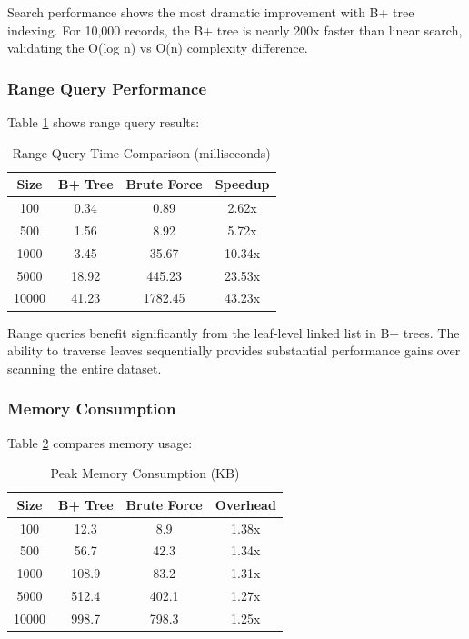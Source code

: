 \documentclass[conference]{IEEEtran}
\begin{document}
Search performance shows the most dramatic improvement with B+ tree indexing. For 10,000 records, the B+ tree is nearly 200x faster than linear search, validating the O(log n) vs O(n) complexity difference.

\subsubsection{Range Query Performance}

Table \ref{tab:range} shows range query results:

\begin{table}[htbp]
\caption{Range Query Time Comparison (milliseconds)}
\begin{center}
\begin{tabular}{|c|c|c|c|}
\hline
\textbf{Size} & \textbf{B+ Tree} & \textbf{Brute Force} & \textbf{Speedup} \\
\hline
100 & 0.34 & 0.89 & 2.62x \\
500 & 1.56 & 8.92 & 5.72x \\
1000 & 3.45 & 35.67 & 10.34x \\
5000 & 18.92 & 445.23 & 23.53x \\
10000 & 41.23 & 1782.45 & 43.23x \\
\hline
\end{tabular}
\label{tab:range}
\end{center}
\end{table}

Range queries benefit significantly from the leaf-level linked list in B+ trees. The ability to traverse leaves sequentially provides substantial performance gains over scanning the entire dataset.

\subsubsection{Memory Consumption}

Table \ref{tab:memory} compares memory usage:

\begin{table}[htbp]
\caption{Peak Memory Consumption (KB)}
\begin{center}
\begin{tabular}{|c|c|c|c|}
\hline
\textbf{Size} & \textbf{B+ Tree} & \textbf{Brute Force} & \textbf{Overhead} \\
\hline
100 & 12.3 & 8.9 & 1.38x \\
500 & 56.7 & 42.3 & 1.34x \\
1000 & 108.9 & 83.2 & 1.31x \\
5000 & 512.4 & 402.1 & 1.27x \\
10000 & 998.7 & 798.3 & 1.25x \\
\hline
\end{tabular}
\label{tab:memory}
\end{center}
\end{table}
\end{document}

